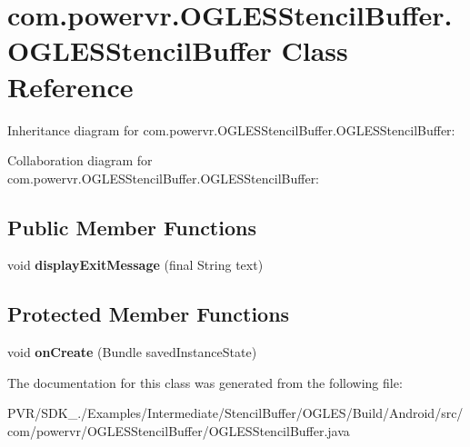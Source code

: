 \hypertarget{classcom_1_1powervr_1_1_o_g_l_e_s_stencil_buffer_1_1_o_g_l_e_s_stencil_buffer}{\section{com.\+powervr.\+O\+G\+L\+E\+S\+Stencil\+Buffer.\+O\+G\+L\+E\+S\+Stencil\+Buffer Class Reference}
\label{classcom_1_1powervr_1_1_o_g_l_e_s_stencil_buffer_1_1_o_g_l_e_s_stencil_buffer}
}


Inheritance diagram for com.\+powervr.\+O\+G\+L\+E\+S\+Stencil\+Buffer.\+O\+G\+L\+E\+S\+Stencil\+Buffer\+:


Collaboration diagram for com.\+powervr.\+O\+G\+L\+E\+S\+Stencil\+Buffer.\+O\+G\+L\+E\+S\+Stencil\+Buffer\+:
\subsection*{Public Member Functions}
\begin{DoxyCompactItemize}
\item 
\hypertarget{classcom_1_1powervr_1_1_o_g_l_e_s_stencil_buffer_1_1_o_g_l_e_s_stencil_buffer_a5911c10191949c364f53642c1c776334}{void {\bfseries display\+Exit\+Message} (final String text)}\label{classcom_1_1powervr_1_1_o_g_l_e_s_stencil_buffer_1_1_o_g_l_e_s_stencil_buffer_a5911c10191949c364f53642c1c776334}

\end{DoxyCompactItemize}
\subsection*{Protected Member Functions}
\begin{DoxyCompactItemize}
\item 
\hypertarget{classcom_1_1powervr_1_1_o_g_l_e_s_stencil_buffer_1_1_o_g_l_e_s_stencil_buffer_a412e86bc72c23bbde4f25a223d89ae0b}{void {\bfseries on\+Create} (Bundle saved\+Instance\+State)}\label{classcom_1_1powervr_1_1_o_g_l_e_s_stencil_buffer_1_1_o_g_l_e_s_stencil_buffer_a412e86bc72c23bbde4f25a223d89ae0b}

\end{DoxyCompactItemize}


The documentation for this class was generated from the following file\+:\begin{DoxyCompactItemize}
\item 
P\+V\+R/\+S\+D\+K\+\_./\+Examples/\+Intermediate/\+Stencil\+Buffer/\+O\+G\+L\+E\+S/\+Build/\+Android/src/com/powervr/\+O\+G\+L\+E\+S\+Stencil\+Buffer/O\+G\+L\+E\+S\+Stencil\+Buffer.\+java\end{DoxyCompactItemize}

